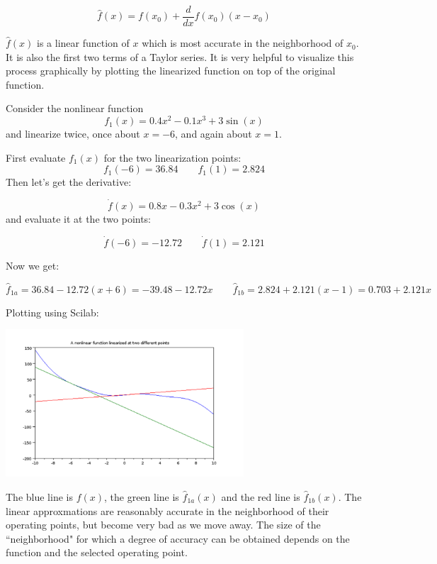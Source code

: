 \[
\hat{f}(x) = f(x_0) + \frac{d}{dx}f(x_0) (x-x_0)
\]

$\hat{f}(x)$ is a linear function of $x$ which is most accurate in the neighborhood of $x_0$.   It is also the  first two terms of a Taylor series.   It is very helpful to visualize this process graphically by plotting the linearized function on top of the original function.



\begin{ExampleSmall}

Consider the nonlinear function
\[
f_1(x) = 0.4x^2 -0.1x^3 + 3\sin(x)
\]
and linearize twice, once about $x=-6$, and again about $x=1$.

\vspace{0.2in}

First evaluate $f_1(x)$ for the two linearization points:
\[
f_1(-6) = 36.84 \qquad  f_1(1) = 2.824
\]
Then let's get the derivative:

\[
\dot{f}(x) = 0.8x -0.3x^2 +3\cos(x)
\]
and evaluate it at the two points:

\[
\dot{f}(-6) = -12.72 \qquad \dot{f}(1) = 2.121
\]

Now we get:

\[
\hat{f}_{1a} = 36.84-12.72(x+6) = -39.48-12.72x \qquad \hat{f}_{1b} = 2.824+2.121(x-1) = 0.703+2.121x
\]

Plotting using Scilab:
\begin{center}
\includegraphics[width=3.5in]{figs01/linearizeattwopointsa.png}
\end{center}

The blue line is $f(x)$, the green line is $\hat{f}_{1a}(x)$ and the red line is $\hat{f}_{1b}(x)$.  The linear approxmations are reasonably accurate in the neighborhood of their operating points, but become very bad as we move away.  The size of the ``neighborhood" for which a degree of accuracy can be obtained depends on the function and the selected operating point.

\end{ExampleSmall}


